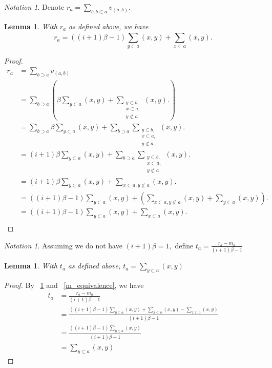 \documentclass[10 pt]{amsart}
\theoremstyle{plain}
\newtheorem{lem}[thm]{Lemma}
\theoremstyle{definition}
\theoremstyle{remark}
\newtheorem{note}[thm]{Notation}
\numberwithin{equation}{section}
\begin{document}
\begin{note}
Denote $r_a = \sum_{b,b\subset a}^{} v_{(a, b)}.$
\end{note}

\begin{lem}
\label{r_equivalence}
With $r_a$ as defined above, we have 
$$r_a = ((i+1)\beta-1)\sum_{y\subset a}^{}(x, y) +\sum_{x\subset a}^{}(x,y).$$
\end{lem}
\begin{proof}
\begin{align*}
	r_a &= \sum_{b\supset a}^{}v_{(a, b)}\\
	&=\sum_{b\supset a}^{} \left(\beta \sum_{y \subset a}^{}(x, y) + \sum_{\substack{{y\subset b,}\\{x \subset a,}\\{y\not\subset a}}}^{}(x, y).\right)\\
	&= \sum_{b\supset a}^{} \beta \sum_{y \subset a}^{}(x, y) + \sum_{b\supset a}^{} \sum_{\substack{{y\subset b,}\\{x \subset a,}\\{y\not\subset a}}}^{}(x, y).\\
	&= (i+1)\beta \sum_{y \subset a}^{}(x, y) + \sum_{b\supset a}^{} \sum_{\substack{{y\subset b,}\\{x \subset a,}\\{y\not\subset a}}}^{}(x, y).\\
	&= (i+1)\beta \sum_{y \subset a}^{}(x, y) + \sum_{x \subset a,y\not\subset a}^{}(x, y).\\
	&= ((i+1)\beta-1) \sum_{y \subset a}^{}(x, y) + \left( \sum_{x \subset a,y\not\subset a}^{}(x, y)+\sum_{y \subset a}^{}(x, y)\right).\\
	&= ((i+1)\beta-1) \sum_{y \subset a}^{}(x, y) + \sum_{x \subset a}^{}(x, y).\\
\end{align*}
\end{proof}
\begin{note}
Assuming we do not have $(i+1)\beta = 1,$ define $t_a = \frac{r_a - m_a}{(i+1)\beta - 1}$
\end{note}

\begin{lem}
\label{t_equivalence}
With $t_a$ as defined above, $t_a= \sum_{y\subset a}^{}(x, y) $
\end{lem}
\begin{proof}
By ~\ref{r_equivalence} and ~\ref{m_equivalence}, we have
\begin{align*}
	t_a &= \frac{r_a - m_a}{(i+1)\beta - 1}\\
	&= \frac{((i+1)\beta-1)\sum_{y\subset a}^{}(x, y) +\sum_{x\subset a}^{}(x, y)-\sum_{x\subset a}^{}(x, y) }{(i+1)\beta - 1}\\
	&= \frac{((i+1)\beta-1)\sum_{y\subset a}^{}(x, y)}{(i+1)\beta - 1}\\
	&= \sum_{y\subset a}^{}(x, y)
\end{align*}
\end{proof}
\end{document}
